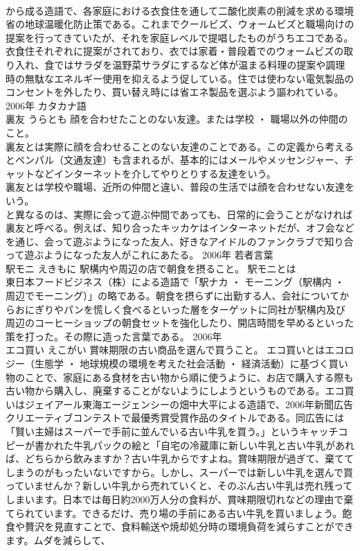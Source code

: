 \documentclass[8pt]{extreport}
\begin{document}
\begin{CJK}{UTF8}{min}
\\	から成る造語で、各家庭における衣食住を通して二酸化炭素の削減を求める環境省の地球温暖化防止策である。これまでクールビズ、ウォームビズと職場向けの提案を行ってきていたが、それを家庭レベルで提唱したものがうちエコである。衣食住それぞれに提案がされており、衣では家着・普段着でのウォームビズの取り入れ、食ではサラダを温野菜サラダにするなど体が温まる料理の提案や調理時の無駄なエネルギー使用を抑えるよう促している。住では使わない電気製品のコンセントを外したり、買い替え時には省エネ製品を選ぶよう謳われている。	2006年	カタカナ語	
\\	裏友	うらとも	顔を合わせたことのない友達。または学校 ・ 職場以外の仲間のこと。	
\\	裏友とは実際に顔を合わせることのない友達のことである。この定義から考えるとペンパル（文通友達）も含まれるが、基本的にはメールやメッセンジャー、チャットなどインターネットを介してやりとりする友達をいう。 
\\	裏友とは学校や職場、近所の仲間と違い、普段の生活では顔を合わせない友達をいう。
\\	と異なるのは、実際に会って遊ぶ仲間であっても、日常的に会うことがなければ裏友と呼べる。例えば、知り合ったキッカケはインターネットだが、オフ会などを通じ、会って遊ぶようになった友人、好きなアイドルのファンクラブで知り合って遊ぶようになった友人がこれにあたる。	2006年	若者言葉	
\\	駅モニ	えきもに	駅構内や周辺の店で朝食を摂ること。	駅モニとは
\\	東日本フードビジネス（株）による造語で「駅ナカ ・ モーニング（駅構内 ・ 周辺でモーニング）」の略である。朝食を摂らずに出勤する人、会社についてからおにぎりやパンを慌しく食べるといった層をターゲットに同社が駅構内及び周辺のコーヒーショップの朝食セットを強化したり、開店時間を早めるといった策を打った。その際に造った言葉である。	2006年	
\\	エコ買い	えこがい	賞味期限の古い商品を選んで買うこと。	エコ買いとはエコロジー（生態学 ・ 地球規模の環境を考えた社会活動 ・ 経済活動）に基づく買い物のことで、家庭にある食材を古い物から順に使うように、お店で購入する際も古い物から購入し、廃棄することがないようにしようというものである。エコ買いはジェイアール東海エージェンシーの畑中大平による造語で、2006年新聞広告クリエーティブコンテストで最優秀賞受賞作品のタイトルである。同広告には「賢い主婦はスーパーで手前に並んでいる古い牛乳を買う。」というキャッチコピーが書かれた牛乳パックの絵と「自宅の冷蔵庫に新しい牛乳と古い牛乳があれば、どちらから飲みますか？古い牛乳からですよね。賞味期限が過ぎて、棄ててしまうのがもったいないですから。しかし、スーパーでは新しい牛乳を選んで買っていませんか？新しい牛乳から売れていくと、そのぶん古い牛乳は売れ残ってしまいます。日本では毎日約2000万人分の食料が、賞味期限切れなどの理由で棄てられています。できるだけ、売り場の手前にある古い牛乳を買いましょう。飽食や贅沢を見直すことで、食料輸送や焼却処分時の環境負荷を減らすことができます。ムダを減らして、

\end{CJK}
\end{document}
